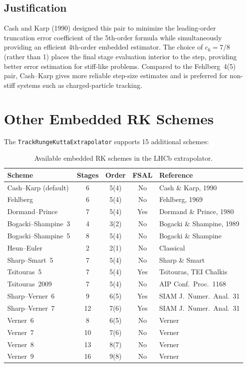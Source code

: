 \documentclass[11pt,a4paper]{article}
\begin{document}
\subsection{Justification}

Cash and Karp (1990) designed this pair to minimize the leading-order
truncation error coefficient of the 5th-order formula while simultaneously
providing an efficient 4th-order embedded estimator. The choice of $c_6=7/8$
(rather than 1) places the final stage evaluation interior to the step,
providing better error estimation for stiff-like problems. Compared to the
Fehlberg~4(5) pair, Cash--Karp gives more reliable step-size estimates and is
preferred for non-stiff systems such as charged-particle tracking.


\section{Other Embedded RK Schemes}\label{sec:other-rk}

The \texttt{TrackRungeKuttaExtrapolator} supports 15 additional schemes:

\begin{table}[H]
\centering
\caption{Available embedded RK schemes in the LHCb extrapolator.}
\label{tab:schemes}
\begin{tabular}{@{}lcccl@{}}
\toprule
\textbf{Scheme} & \textbf{Stages} & \textbf{Order} & \textbf{FSAL} & \textbf{Reference} \\
\midrule
Cash--Karp (default) & 6 & 5(4) & No & Cash \& Karp, 1990 \\
Fehlberg             & 6 & 5(4) & No & Fehlberg, 1969 \\
Dormand--Prince      & 7 & 5(4) & Yes & Dormand \& Prince, 1980 \\
Bogacki--Shampine~3  & 4 & 3(2) & No & Bogacki \& Shampine, 1989 \\
Bogacki--Shampine~5  & 8 & 5(4) & No & Bogacki \& Shampine \\
Heun--Euler          & 2 & 2(1) & No & Classical \\
Sharp--Smart~5       & 7 & 5(4) & No & Sharp \& Smart \\
Tsitouras~5          & 7 & 5(4) & Yes & Tsitouras, TEI Chalkis \\
Tsitouras~2009       & 7 & 5(4) & No & AIP Conf.\ Proc.\ 1168 \\
Sharp--Verner~6      & 9 & 6(5) & Yes & SIAM J.\ Numer.\ Anal.\ 31 \\
Sharp--Verner~7      & 12& 7(6) & Yes & SIAM J.\ Numer.\ Anal.\ 31 \\
Verner~6             & 8 & 6(5) & No & Verner \\
Verner~7             & 10& 7(6) & No & Verner \\
Verner~8             & 13& 8(7) & No & Verner \\
Verner~9             & 16& 9(8) & No & Verner \\
\bottomrule
\end{tabular}
\end{table}
\end{document}
